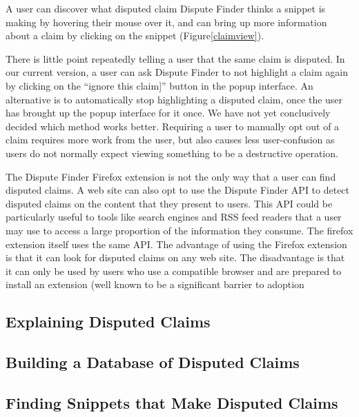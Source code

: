 \documentclass{www2010-submission}
\newcommand{\todo}[1]{}
\begin{document}
A user can discover what disputed claim Dispute Finder thinks a snippet is making by hovering their mouse over it, and can bring up more information about a claim by clicking on the snippet (Figure\ref{claimview}).

There is little point repeatedly telling a user that the same claim is disputed. In our current version, a user can ask Dispute Finder to not highlight a claim again by clicking on the ``ignore this claim]'' button in the popup interface. An alternative is to automatically stop highlighting a disputed claim, once the user has brought up the popup interface for it once. We have not yet conclusively decided which method works better. Requiring a user to manually opt out of a claim requires more work from the user, but also causes less user-confusion as users do not normally expect viewing something to be a destructive operation.

The Dispute Finder Firefox extension is not the only way that a user can find disputed claims. A web site can also opt to use the Dispute Finder API to detect disputed claims on the content that they present to users. This API could be particularly useful to tools like search engines and RSS feed readers that a user may use to access a large proportion of the information they consume. The firefox extension itself uses the same API. The advantage of using the Firefox extension is that it can look for disputed claims on any web site. The disadvantage is that it can only be used by users who use a compatible browser and are prepared to install an extension (well known to be a significant barrier to adoption\cite{extension-bad?}

\todo{Document API online}
\todo{Change the highlight color to yellow? Auto-adjust highlight color based on background color?}
\todo{Should we automatically adjust the highlight color, based on the background color of the page}

\subsection{Explaining Disputed Claims}

\subsection{Building a Database of Disputed Claims}

\subsection{Finding Snippets that Make Disputed Claims}
\end{document}
